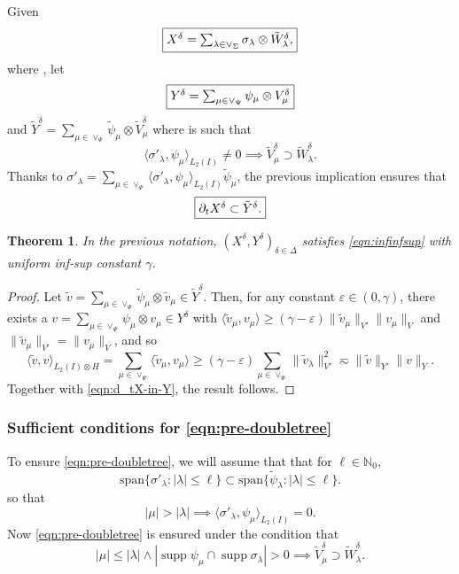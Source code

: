 \documentclass[11pt,a4paper,oneside,english]{amsart}
\numberwithin{equation}{section}
\newtheorem{theorem}{Theorem}
\numberwithin{theorem}{section}
\theoremstyle{definition}
\newcommand{\N}{\mathbb{N}}
\newcommand{\eps}{\varepsilon}
\DeclareMathOperator{\supp}{supp}
\providecommand{\spann}{\mathrm{span}}
\newcommand{\la}{\langle}
\newcommand{\ra}{\rangle}
\newcommand{\jw}[1]{{\color{red}{JW: #1}}}
\newcommand{\rvv}[1]{{\color{teal}{RvV: #1}}}
\begin{document}
Given
\[
\framebox{$X^\delta=\sum_{\lambda \in \vee_\Sigma} \sigma_\lambda \otimes \tilde{W}_\lambda^\delta,$}
\]
where , let
\[
\framebox{$Y^\delta=\sum_{\mu \in \vee_\Psi} \psi_\mu \otimes V_\mu^\delta$}
\]
and $\tilde{Y}^\delta=\sum_{\mu \in \vee_\Psi} \tilde{\psi}_\mu \otimes \tilde{V}_\mu^\delta$ 
where  is such that 
\begin{equation}
  \label{eqn:pre-doubletree}
  \la \sigma'_\lambda,\psi_\mu\ra_{L_2(I)} \neq 0 \implies \tilde{V}^\delta_\mu \supset \tilde{W}^\delta_\lambda.
\end{equation}
\jw{hoe werkt deze eis precies?}
Thanks to $\sigma'_\lambda=\sum_{\mu \in \vee_\Psi} \la \sigma'_\lambda,\psi_\mu\ra_{L_2(I)}\tilde{\psi}_\mu$, the previous implication ensures that
\begin{equation}
  \label{eqn:d_tX-in-Y}
 \framebox{$\partial_t X^\delta \subset \tilde{Y}^\delta.$}
\end{equation}
\rvv{deze uitlijning is slecht}
\begin{theorem}
In the previous notation, $(X^\delta,Y^\delta)_{\delta \in \Delta}$ satisfies
  \eqref{eqn:infinfsup} with uniform inf-sup constant $\gamma$.
\end{theorem}
\begin{proof}
  \jw{Ik ben dit nog niet nagegaan.}
Let $\tilde v=\sum_{\mu \in \vee_\Psi} \tilde{\psi}_\mu \otimes \tilde{v}_\mu \in \tilde{Y}^\delta$.
Then, for any constant $\eps\in (0,\gamma)$, there exists a $v=\sum_{\mu \in \vee_\Psi} \psi_\mu \otimes v_\mu \in Y^\delta$  with $\la \tilde v_\mu,v_\mu\ra \geq (\gamma-\eps) \|\tilde{v}_\mu\|_{V'} \|v_\mu\|_V$ and $\|\tilde{v}_\mu\|_{V'}= \|v_\mu\|_V$, and so
\[
  \la\tilde v, v\ra_{L_2(I)\otimes H}
  = \sum_{\mu \in \vee_\Psi} \la \tilde{v}_\mu,v_\mu\ra \geq (\gamma-\eps) 
  \sum_{\mu \in \vee_\Psi} \|\tilde{v}_\lambda\|_{V'}^2
  \eqsim \|\tilde v\|_{Y'} \|v\|_Y.
\]
  Together with \eqref{eqn:d_tX-in-Y}, the result follows.
\end{proof}

\subsubsection{Sufficient conditions for \eqref{eqn:pre-doubletree}}
\label{sec:spaces}
To ensure \eqref{eqn:pre-doubletree}, we will assume that that for $\ell \in \N_0$,
\[
\spann\{\sigma'_\lambda\colon |\lambda|\leq \ell\} \subset \spann\{\tilde{\psi}_\lambda\colon |\lambda|\leq \ell\}.
\]
 so that
\begin{equation}
  \label{eqn:deriv-orthogonal}
  |\mu| >|\lambda| \implies \la \sigma'_\lambda,\psi_\mu\ra_{L_2(I)}=0.
 \end{equation}
Now \eqref{eqn:pre-doubletree} is ensured under the condition that
\begin{equation}
\label{eqn:Y-space-refined}
  |\mu| \leq |\lambda| \wedge|\supp \psi_\mu \cap \supp \sigma_\lambda|>0 \implies \tilde{V}^\delta_\mu \supset  \tilde{W}^\delta_\lambda.
\end{equation}
\end{document}

